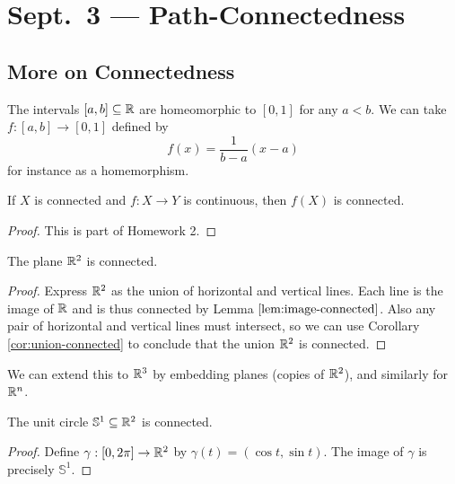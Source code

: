 \chapter{Sept.~3 --- Path-Connectedness}

\section{More on Connectedness}
\begin{remark}
  The intervals $[a, b] \subseteq \mathbb{R}$ are homeomorphic
  to $[0, 1]$ for any $a < b$. We can take
  $f : [a, b] \to [0, 1]$ defined by
  \[
    f(x) = \frac{1}{b - a}(x - a)
  \]
  for instance as a homemorphism.
\end{remark}

\begin{lemma}
  \label{lem:image-connected}
  If $X$ is connected and $f : X \to Y$
  is continuous, then $f(X)$ is connected.
\end{lemma}

\begin{proof}
  This is part of Homework 2.
\end{proof}

\begin{corollary}
  The plane $\mathbb{R}^2$ is connected.
\end{corollary}

\begin{proof}
  Express $\mathbb{R}^2$ as the union of
  horizontal and vertical lines. Each line is the
  image of $\mathbb{R}$ and is thus connected by
  Lemma $\ref{lem:image-connected}$.
  Also any pair of
  horizontal and vertical lines must intersect,
  so we can use Corollary \ref{cor:union-connected}
  to conclude that the union $\mathbb{R}^2$ is connected.
\end{proof}

\begin{remark}
  We can extend this to $\mathbb{R}^3$ by embedding
  planes (copies of $\mathbb{R}^2$), and similarly for $\mathbb{R}^n$.
\end{remark}

\begin{prop}
  The unit circle $\mathbb{S}^1 \subseteq \mathbb{R}^2$
  is connected.
\end{prop}

\begin{proof}
  Define $\gamma : [0, 2\pi] \to \mathbb{R}^2$
  by $\gamma(t) = (\cos t, \sin t)$.
  The image of $\gamma$ is precisely $\mathbb{S}^1$.
\end{proof}


